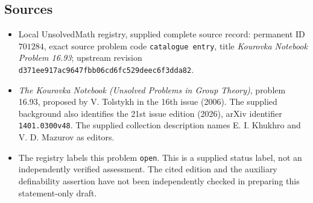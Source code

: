 \documentclass[11pt]{article}
\begin{document}
\subsection{Sources}
\begin{itemize}
\item Local UnsolvedMath registry, supplied complete source record: permanent ID \(701284\), exact source problem code \texttt{catalogue entry}, title \emph{Kourovka Notebook Problem 16.93}; upstream revision \texttt{d371ee917ac9647fbb06cd6fc529deec6f3dda82}.
\item \emph{The Kourovka Notebook (Unsolved Problems in Group Theory)}, problem 16.93, proposed by V. Tolstykh in the 16th issue (2006). The supplied background also identifies the 21st issue edition (2026), arXiv identifier \texttt{1401.0300v48}. The supplied collection description names E. I. Khukhro and V. D. Mazurov as editors.
\item The registry labels this problem \texttt{open}. This is a supplied status label, not an independently verified assessment. The cited edition and the auxiliary definability assertion have not been independently checked in preparing this statement-only draft.
\end{itemize}
\end{document}
